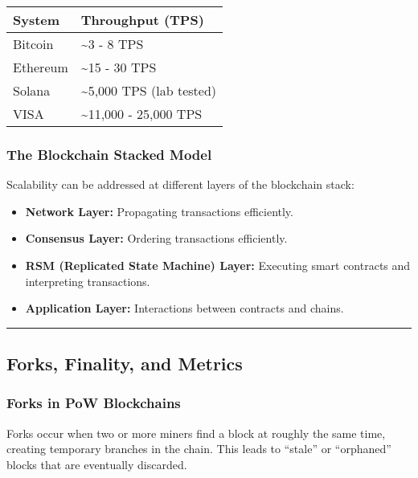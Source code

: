 \begin{tabular}{ll}
	\toprule
	System & Throughput (TPS) \\
	\midrule
	Bitcoin & \textasciitilde3 - 8 TPS \\
	Ethereum & \textasciitilde15 - 30 TPS \\
	Solana & \textasciitilde5,000 TPS (lab tested) \\
	VISA & \textasciitilde11,000 - 25,000 TPS \\
	\bottomrule
\end{tabular}

\subsubsection{The Blockchain Stacked
Model}\label{the-blockchain-stacked-model}

Scalability can be addressed at different layers of the blockchain
stack:


\begin{itemize}
\tightlist
\item
  \textbf{Network Layer:} Propagating transactions efficiently.
\item
  \textbf{Consensus Layer:} Ordering transactions efficiently.
\item
  \textbf{RSM (Replicated State Machine) Layer:} Executing smart
  contracts and interpreting transactions.
\item
  \textbf{Application Layer:} Interactions between contracts and chains.
\end{itemize}

\begin{center}\rule{0.5\linewidth}{0.5pt}\end{center}

\subsection{Forks, Finality, and
Metrics}\label{section-2-forks-finality-and-metrics}

\subsubsection{Forks in PoW
Blockchains}\label{forks-in-pow-blockchains}

Forks occur when two or more miners find a block at roughly the same
time, creating temporary branches in the chain. This leads to ``stale''
or ``orphaned'' blocks that are eventually discarded.

